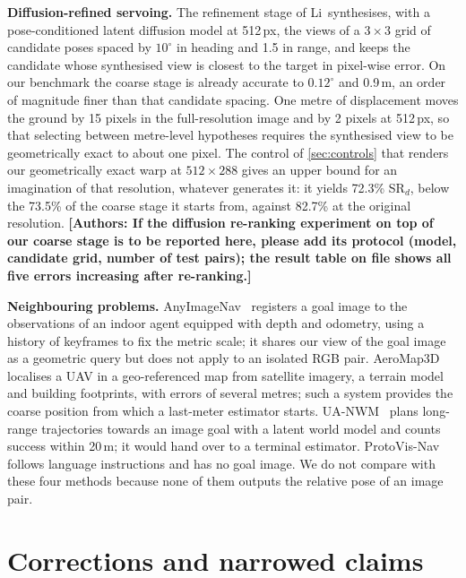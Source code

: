 \documentclass[10pt,twocolumn,letterpaper]{article}
\newcommand{\SRd}{SR$_{d}$}
\newcommand{\todoauthors}[1]{\textbf{\color{red}[Authors: #1]}}
\begin{document}
\noindent\textbf{Diffusion-refined servoing.} The refinement stage of Li~\etal synthesises, with a pose-conditioned latent diffusion model at 512\,px, the views of a $3{\times}3$ grid of candidate poses spaced by $10^\circ$ in heading and 1.5 in range, and keeps the candidate whose synthesised view is closest to the target in pixel-wise error. On our benchmark the coarse stage is already accurate to $0.12^\circ$ and 0.9\,m, an order of magnitude finer than that candidate spacing. One metre of displacement moves the ground by 15 pixels in the full-resolution image and by 2 pixels at 512\,px, so that selecting between metre-level hypotheses requires the synthesised view to be geometrically exact to about one pixel. The control of \cref{sec:controls} that renders our geometrically exact warp at $512{\times}288$ gives an upper bound for an imagination of that resolution, whatever generates it: it yields 72.3\% \SRd, below the 73.5\% of the coarse stage it starts from, against 82.7\% at the original resolution. \todoauthors{If the diffusion re-ranking experiment on top of our coarse stage is to be reported here, please add its protocol (model, candidate grid, number of test pairs); the result table on file shows all five errors increasing after re-ranking.}

\noindent\textbf{Neighbouring problems.} AnyImageNav~\cite{deng2026anyimagenav} registers a goal image to the observations of an indoor agent equipped with depth and odometry, using a history of keyframes to fix the metric scale; it shares our view of the goal image as a geometric query but does not apply to an isolated RGB pair. AeroMap3D~\cite{deng2026aeromap3d} localises a UAV in a geo-referenced map from satellite imagery, a terrain model and building footprints, with errors of several metres; such a system provides the coarse position from which a last-meter estimator starts. UA-NWM~\cite{zhu2026uanwm} plans long-range trajectories towards an image goal with a latent world model and counts success within 20\,m; it would hand over to a terminal estimator. ProtoVis-Nav~\cite{sui2026protovisnav} follows language instructions and has no goal image. We do not compare with these four methods because none of them outputs the relative pose of an image pair.

\section{Corrections and narrowed claims}
\label{sec:corrections}
\end{document}
